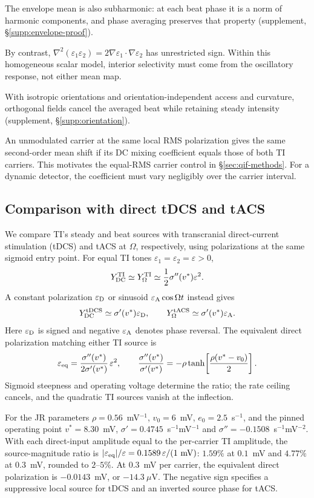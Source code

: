 \documentclass[a4paper]{article}
\newif\ifjne
\newcommand{\Sig}{\sigma}
\begin{document}
The envelope mean is also subharmonic: at each beat phase it is a norm of
harmonic components, and phase averaging preserves that property (supplement,
\S\ref{supp:envelope-proof}).
\ifjne\else

\fi
By contrast,
$\nabla^2(\varepsilon_1\varepsilon_2)=2\nabla\varepsilon_1\cdot\nabla\varepsilon_2$
has unrestricted sign. Within this homogeneous scalar model, interior
selectivity must come from the oscillatory response, not either mean map.

With isotropic orientations and orientation-independent access and curvature,
orthogonal fields cancel the averaged beat while retaining steady intensity
(supplement, \S\ref{supp:orientation}).
\ifjne\else

\fi

An unmodulated carrier at the same local RMS polarization gives the same
second-order mean shift if its DC mixing coefficient equals those of both
TI carriers. This motivates the equal-RMS carrier control in
\S\ref{sec:qif-methods}. For a dynamic detector, the coefficient must vary
negligibly over the carrier interval.

\subsection{Comparison with direct tDCS and tACS}\label{sec:direct-comparison}
We compare TI's steady and beat sources with transcranial direct-current
stimulation (tDCS) and tACS at $\Omega$, respectively, using polarizations
at the same sigmoid entry point. For equal TI tones
$\varepsilon_1=\varepsilon_2=\varepsilon>0$,
\[
Y_{\rm DC}^{\rm TI}\simeq Y_\Omega^{\rm TI}
\simeq \frac12\Sig''(v^*)\varepsilon^2.
\]
A constant polarization $\varepsilon_{\rm D}$ or sinusoid
$\varepsilon_{\rm A}\cos\Omega t$ instead gives
\[
Y_{\rm DC}^{\rm tDCS}\simeq\Sig'(v^*)\varepsilon_{\rm D},
\qquad
Y_\Omega^{\rm tACS}\simeq\Sig'(v^*)\varepsilon_{\rm A}.
\]
Here $\varepsilon_{\rm D}$ is signed and negative $\varepsilon_{\rm A}$
denotes phase reversal. The equivalent direct polarization matching either
TI source is
\[
\varepsilon_{\rm eq}
=\frac{\Sig''(v^*)}{2\Sig'(v^*)}\,\varepsilon^2,
\qquad
\frac{\Sig''(v^*)}{\Sig'(v^*)}
=-\rho\tanh\!\left[\frac{\rho(v^*-v_0)}2\right].
\]
Sigmoid steepness and operating voltage determine the ratio; the rate ceiling
cancels, and the quadratic TI sources vanish at the inflection.

For the JR parameters $\rho=0.56$~mV$^{-1}$, $v_0=6$~mV,
$e_0=2.5$~s$^{-1}$, and the pinned operating point $v^*=8.30$~mV,
$\Sig'=0.4745$~s$^{-1}$mV$^{-1}$ and
$\Sig''=-0.1508$~s$^{-1}$mV$^{-2}$. With each direct-input amplitude
equal to the per-carrier TI amplitude, the source-magnitude ratio is
$|\varepsilon_{\rm eq}|/\varepsilon
=0.1589\,\varepsilon/(1~\mathrm{mV})$:
$1.59\%$ at $0.1$~mV and $4.77\%$ at $0.3$~mV, rounded to $2$--$5\%$.
At $0.3$~mV per carrier, the equivalent direct polarization is
$-0.0143$~mV, or $-14.3~\mu$V. The negative sign specifies a suppressive
local source for tDCS and an inverted source phase for tACS.
\end{document}
